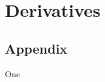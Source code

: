 \documentclass{book}
\begin{document}
\chapter{Derivatives}



\printbibliography

\newpage

\begin{appendix}
\chapter{Appendix}
	One
	
\end{appendix}
\end{document}
